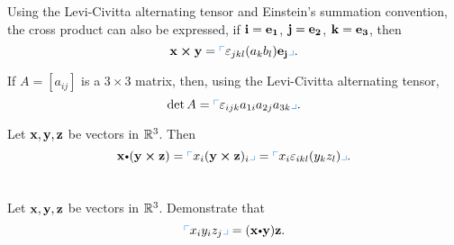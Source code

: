 \begin{exa}
Using the Levi-Civitta alternating tensor and Einstein's summation
convention, the cross product can also be expressed, if
$\mathbf{ i}=\mathbf{ e_1}$, $\mathbf{ j}=\mathbf{ e_2}$,
$\mathbf{ k}=\mathbf{ e_3}$, then
$$\crossprod{x}{y} = \es{\varepsilon _{jkl}(a_kb_l)\vector{e_j}}.$$
\end{exa}
\begin{exa}
If $A=[a_{ij}]$ is a $3\times 3$ matrix, then, using the
Levi-Civitta alternating tensor,
$$\det A = \es{\varepsilon _{ijk}a_{1i}a_{2j}a_{3k}}.  $$
\end{exa}
\begin{exa}
Let $\mathbf{ x}, \mathbf{ y}, \mathbf{ z}$ be vectors in $\mathbb{R}^3$.
Then $$ \vector{x}\bp (\crossprod{y}{z}) =
\es{x_i(\crossprod{y}{z})_i} = \es{x_i\varepsilon _{ikl}(y_kz_l) }.
$$
\end{exa}

\section*{}\begin{multicols}{2}\columnseprule 1pt \columnsep 25pt
\begin{problem}
Let $\mathbf{ x}, \mathbf{ y}, \mathbf{ z}$ be vectors in $\mathbb{R}^3$.
Demonstrate that
$$  \es{x_iy_iz_j} = (\dotprod{x}{y})\vector{z}. $$
\end{problem}
\end{multicols}

